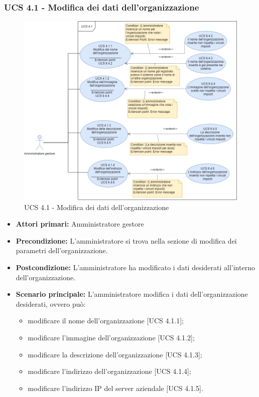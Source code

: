 \subsubsection{UCS 4.1 - Modifica dei dati dell'organizzazione}%
\begin{figure}[h]
	\centering
    \includegraphics[scale=0.53]{Sezioni/UseCase/Immagini/UCS4.1.png}
    \caption{UCS 4.1 - Modifica dei dati dell'organizzazione}
\end{figure}
\begin{itemize}
    \item \textbf{Attori primari:} Amministratore gestore
    \item \textbf{Precondizione:} L'amministratore si trova nella sezione di modifica dei parametri dell'organizzazione.
    \item \textbf{Postcondizione:} L'amministratore ha modificato i dati desiderati all'interno dell'organizzazione.
    \item \textbf{Scenario principale:} L'amministratore modifica i dati dell'organizzazione desiderati, ovvero può:
    \begin{itemize}
        \item modificare il nome dell'organizzazione [UCS 4.1.1];
        \item modificare l'immagine dell'organizzazione [UCS 4.1.2];
        \item modificare la descrizione dell'organizzazione [UCS 4.1.3];
        \item modificare l'indirizzo dell'organizzazione [UCS 4.1.4];
        \item modificare l'indirizzo IP del server aziendale [UCS 4.1.5].
    \end{itemize}
\end{itemize}

